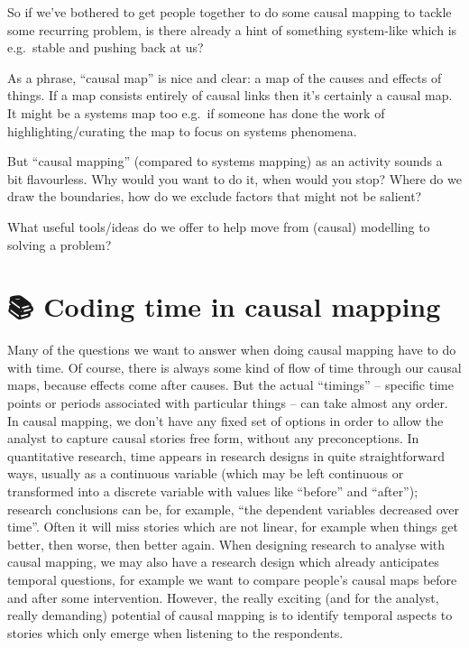 \documentclass[
]{book}
\begin{document}
So if we've bothered to get people together to do some causal mapping to tackle some recurring problem, is there already a hint of something system-like which is e.g.~stable and pushing back at us?

As a phrase, ``causal map'' is nice and clear: a map of the causes and effects of things. If a map consists entirely of causal links then it's certainly a causal map. It might be a systems map too e.g.~if someone has done the work of highlighting/curating the map to focus on systems phenomena.

But ``causal mapping'' (compared to systems mapping) as an activity sounds a bit flavourless. Why would you want to do it, when would you stop? Where do we draw the boundaries, how do we exclude factors that might not be salient?

What useful tools/ideas do we offer to help move from (causal) modelling to solving a problem?

\hypertarget{coding-time-in-causal-mapping}{%
\chapter{📚 Coding time in causal mapping}\label{coding-time-in-causal-mapping}}

Many of the questions we want to answer when doing causal mapping have to do with time. Of course, there is always some kind of flow of time through our causal maps, because effects come after causes. But the actual ``timings'' -- specific time points or periods associated with particular things -- can take almost any order. In causal mapping, we don't have any fixed set of options in order to allow the analyst to capture causal stories free form, without any preconceptions. In quantitative research, time appears in research designs in quite straightforward ways, usually as a continuous variable (which may be left continuous or transformed into a discrete variable with values like ``before'' and ``after''); research conclusions can be, for example, ``the dependent variables decreased over time''. Often it will miss stories which are not linear, for example when things get better, then worse, then better again. When designing research to analyse with causal mapping, we may also have a research design which already anticipates temporal questions, for example we want to compare people's causal maps before and after some intervention. However, the really exciting (and for the analyst, really demanding) potential of causal mapping is to identify temporal aspects to stories which only emerge when listening to the respondents.
\end{document}
